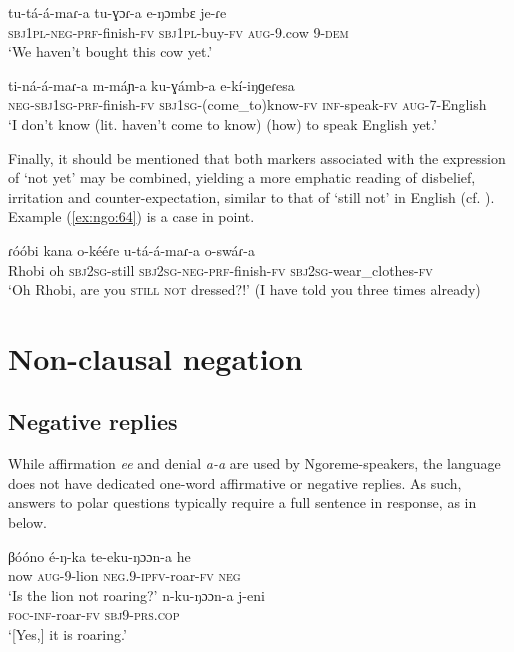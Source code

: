 \documentclass[output=paper,colorlinks,citecolor=brown,draftmode]{langscibook}
\begin{document}
\ea\label{ex:ngo:62} 
    \gll tu-tá-á-maɾ{}-a tu-ɣɔɾ{}-a e-ŋɔmbɛ je-ɾe\\ 
        \textsc{sbj}1\textsc{pl}{}-\textsc{neg-prf}{}-finish-\textsc{fv} \textsc{sbj}1\textsc{pl}{}-buy-\textsc{fv} \textsc{aug-}9.cow 9-\textsc{dem}\\
    \glt  ‘We haven’t bought this cow yet.’
\z 

\ea\label{ex:ngo:63} 
    \gll ti-ná-á-maɾ{}-a m-máɲ{}-a ku-ɣámb-a e{}-kí{}-iŋɡeɾesa\\ 
        \textsc{neg}{}-\textsc{sbj}1\textsc{sg}{}-\textsc{prf}{}-finish-\textsc{fv} \textsc{sbj}1\textsc{sg}{}-(come\_to)know-\textsc{fv} \textsc{inf}{}-speak-\textsc{fv} \textsc{aug-}7-English\\
    \glt ‘I don’t know (lit. haven’t come to know) (how) to speak English yet.’
\z 

Finally, it should be mentioned that both markers associated with the expression of ‘not yet’ may be combined, yielding a more emphatic reading of disbelief, irritation and counter-expectation, similar to that of ‘still not’ in English (cf. \citealt[2]{Baar1997}). Example (\ref{ex:ngo:64}) is a case in point.

\ea\label{ex:ngo:64} 
    \gll ɾóóbi kana o-kééɾe u-tá-á{}-maɾ{}-a o-swáɾ{}-a\\ 
        Rhobi oh \textsc{sbj}2\textsc{sg}{}-still \textsc{sbj}2\textsc{sg}{}-\textsc{neg-prf}{}-finish-\textsc{fv} \textsc{sbj}2\textsc{sg}{}-wear\_clothes-\textsc{fv}\\
    \glt  ‘Oh Rhobi, are you \textsc{still not} dressed?!’ (I have told you three times already) 
\z 

\section{Non-clausal negation}\label{sec:ngo:3}
\subsection{Negative replies}\label{sec:ngo:3.1}

While affirmation \textit{ee} and denial \textit{a-a} are used by Ngoreme-speakers, the language does not have dedicated one-word affirmative or negative replies. As such, answers to polar questions typically require a full sentence in response, as in  below.

\ea\label{ex:ngo:65}
    \begin{xlist}[Q: ]
    \label{ex:ngo:65a}
        \gll βóóno é{}-ŋ{}-ka te-eku{}-ŋɔɔn{}-a he\\
             now \textsc{aug}{}-9-lion \textsc{neg.9-ipfv}{}-roar-\textsc{fv} \textsc{neg}\\
        \glt‘Is the lion not roaring?’ 
    \label{ex:ngo:65b}
        \gll n-ku-ŋɔɔn-a j-eni\\
             \textsc{foc-inf}{}-roar-\textsc{fv} \textsc{sbj9-prs.cop}\\
        \glt ‘[Yes,] it is roaring.’
    \end{xlist}
\z 
 
\end{document}
